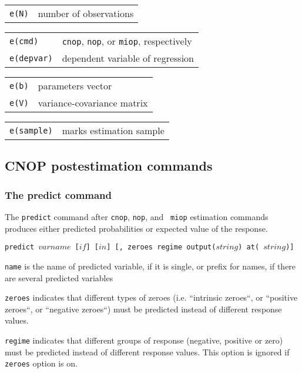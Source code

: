\documentclass[letterpaper,fleqn,11pt]{article}
\begin{document}
\begin{onehalfspace}
\begin{tabular}{p{3cm}p{12cm}}
\texttt{e(N)} & number of observations%
\end{tabular}


\begin{tabular}{p{3cm}p{12cm}}
\texttt{e(cmd)} & \texttt{cnop}, \texttt{nop}, or \texttt{miop}, respectively
\\ 
\texttt{e(depvar)} & dependent variable of regression%
\end{tabular}


\begin{tabular}{p{3cm}p{12cm}}
\texttt{e(b)} & parameters vector \\ 
\texttt{e(V)} & variance-covariance matrix%
\end{tabular}


\begin{tabular}{p{3cm}p{12cm}}
\texttt{e(sample)} & marks estimation sample%
\end{tabular}

\subsection*{CNOP postestimation commands}

\subsubsection*{The predict command}

The \texttt{predict} command after \texttt{cnop}, \texttt{nop}, and \texttt{%
miop} estimation commands produces either predicted probabilities or
expected value of the response.

\texttt{predict $varname$ [$if$] [$in$] [, zeroes regime output($string$) at(%
$string$)]}

\texttt{name} is the name of predicted variable, if it is single, or prefix
for names, if there are several predicted variables

\texttt{zeroes} indicates that different types of zeroes (i.e. ``intrinsic
zeroes``, or ``positive zeroes``, or ``negative zeroes``) must be predicted
instead of different response values.

\texttt{regime} indicates that different groups of response (negative,
positive or zero) must be predicted instead of different response values.
This option is ignored if \texttt{zeroes} option is on.


\end{onehalfspace}
\end{document}
